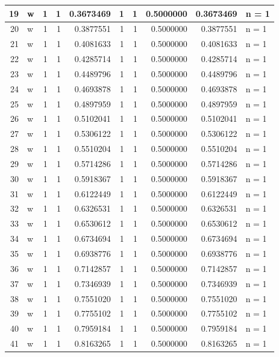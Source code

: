 \documentclass[
  letterpaper,
  DIV=11,
  numbers=noendperiod]{scrreprt}
\begin{document}
\begin{table}
\begin{tabular}[t]{r|l|r|r|r|r|r|r|r|l}
19 & w & 1 & 1 & 0.3673469 & 1 & 1 & 0.5000000 & 0.3673469 & n = 1\\
\hline
20 & w & 1 & 1 & 0.3877551 & 1 & 1 & 0.5000000 & 0.3877551 & n = 1\\
\hline
21 & w & 1 & 1 & 0.4081633 & 1 & 1 & 0.5000000 & 0.4081633 & n = 1\\
\hline
22 & w & 1 & 1 & 0.4285714 & 1 & 1 & 0.5000000 & 0.4285714 & n = 1\\
\hline
23 & w & 1 & 1 & 0.4489796 & 1 & 1 & 0.5000000 & 0.4489796 & n = 1\\
\hline
24 & w & 1 & 1 & 0.4693878 & 1 & 1 & 0.5000000 & 0.4693878 & n = 1\\
\hline
25 & w & 1 & 1 & 0.4897959 & 1 & 1 & 0.5000000 & 0.4897959 & n = 1\\
\hline
26 & w & 1 & 1 & 0.5102041 & 1 & 1 & 0.5000000 & 0.5102041 & n = 1\\
\hline
27 & w & 1 & 1 & 0.5306122 & 1 & 1 & 0.5000000 & 0.5306122 & n = 1\\
\hline
28 & w & 1 & 1 & 0.5510204 & 1 & 1 & 0.5000000 & 0.5510204 & n = 1\\
\hline
29 & w & 1 & 1 & 0.5714286 & 1 & 1 & 0.5000000 & 0.5714286 & n = 1\\
\hline
30 & w & 1 & 1 & 0.5918367 & 1 & 1 & 0.5000000 & 0.5918367 & n = 1\\
\hline
31 & w & 1 & 1 & 0.6122449 & 1 & 1 & 0.5000000 & 0.6122449 & n = 1\\
\hline
32 & w & 1 & 1 & 0.6326531 & 1 & 1 & 0.5000000 & 0.6326531 & n = 1\\
\hline
33 & w & 1 & 1 & 0.6530612 & 1 & 1 & 0.5000000 & 0.6530612 & n = 1\\
\hline
34 & w & 1 & 1 & 0.6734694 & 1 & 1 & 0.5000000 & 0.6734694 & n = 1\\
\hline
35 & w & 1 & 1 & 0.6938776 & 1 & 1 & 0.5000000 & 0.6938776 & n = 1\\
\hline
36 & w & 1 & 1 & 0.7142857 & 1 & 1 & 0.5000000 & 0.7142857 & n = 1\\
\hline
37 & w & 1 & 1 & 0.7346939 & 1 & 1 & 0.5000000 & 0.7346939 & n = 1\\
\hline
38 & w & 1 & 1 & 0.7551020 & 1 & 1 & 0.5000000 & 0.7551020 & n = 1\\
\hline
39 & w & 1 & 1 & 0.7755102 & 1 & 1 & 0.5000000 & 0.7755102 & n = 1\\
\hline
40 & w & 1 & 1 & 0.7959184 & 1 & 1 & 0.5000000 & 0.7959184 & n = 1\\
\hline
41 & w & 1 & 1 & 0.8163265 & 1 & 1 & 0.5000000 & 0.8163265 & n = 1\\

\end{tabular}
\end{table}
\end{document}
